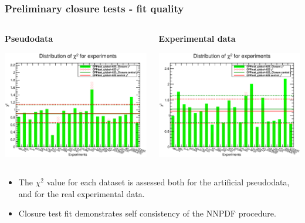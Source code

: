 \documentclass[10pt]{beamer}
\begin{document}
\begin{frame}
\frametitle{Preliminary closure tests - fit quality}

 \begin{columns}
  \begin{column}{0.5\textwidth}
  \begin{center}  \textbf{Pseudodata} \end{center}
     \includegraphics[width=1.0\textwidth]{chi2_histo_nnpdf1.eps}
     \end{column}
       \begin{column}{0.5\textwidth}
         \begin{center}  \textbf{Experimental data} \end{center}

     \includegraphics[width=1.0\textwidth]{chi2_histo_nnpdf2.eps}
     \end{column}
     \end{columns}
     \vskip10pt
     \begin{itemize}
     \item<1-> The $\chi^2$ value for each dataset is assessed both for the artificial pseudodata, and for the real experimental data.
     \item<1-> Closure test fit demonstrates self consistency of the NNPDF procedure.
     \end{itemize}


\end{frame}
\end{document}
